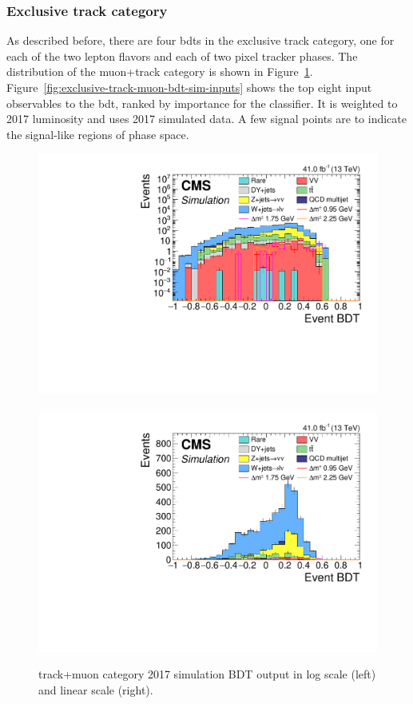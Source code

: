 \clearpage
\subsubsection{Exclusive track category}

As described before, there are four \glspl{bdt} in the exclusive track category, one for each of the two lepton flavors and each of two pixel tracker phases. The distribution of the muon+track category is shown in Figure~\ref{fig:exclusive-track-bdt-sim-output}. Figure~\ref{fig:exclusive-track-muon-bdt-sim-inputs} shows the top eight input observables to the \gls{bdt}, ranked by importance for the classifier. It is weighted to 2017 luminosity and uses 2017 simulated data. A few signal points are to indicate the signal-like regions of phase space. 

\begin{figure}[!htb]
\centering
\includegraphics[width=0.48\linewidth]{plots/track_muon_bg_signal/none_exTrack_dilepBDTCorrJetNoMultIso10Dr0.6_log.pdf} \,
\includegraphics[width=0.48\linewidth]{plots/track_muon_bg_signal/none_exTrack_dilepBDTCorrJetNoMultIso10Dr0.6.pdf} \\

\caption[Exclusive track plus muon 2017 simulation BDT output]{track+muon category 2017 simulation BDT output in log scale (left) and linear scale (right).}
\label{fig:exclusive-track-bdt-sim-output}
\end{figure}

